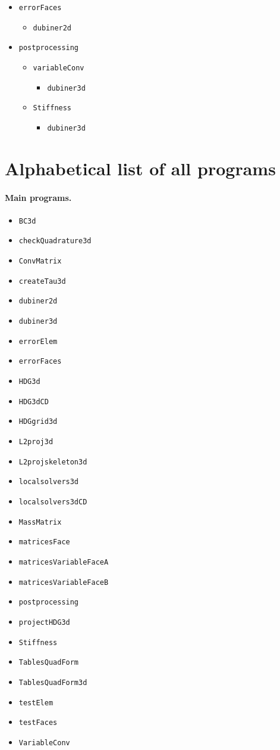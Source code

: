 \documentclass[10pt,english]{article}
\begin{document}
\begin{itemize}
\begin{itemize}
\end{itemize}
\item{\tt errorFaces}
\begin{itemize}
\item {\tt dubiner2d}
\end{itemize}
\item {\tt postprocessing}
\begin{itemize}
\item {\tt variableConv}
\begin{itemize}
\item {\tt dubiner3d}
\end{itemize}
\item{\tt Stiffness}
\begin{itemize}
\item {\tt dubiner3d}
\end{itemize}
\end{itemize}
\end{itemize}


\section{Alphabetical list of all programs}

\paragraph{Main programs.} 
\begin{itemize}
\item {\tt BC3d}
\item {\tt checkQuadrature3d}
\item {\tt ConvMatrix}
\item {\tt createTau3d}
\item {\tt dubiner2d}
\item {\tt dubiner3d}
\item {\tt errorElem}
\item {\tt errorFaces}
\item {\tt HDG3d}
\item {\tt HDG3dCD}
\item {\tt HDGgrid3d}
\item {\tt L2proj3d}
\item {\tt L2projskeleton3d}
\item {\tt localsolvers3d}
\item {\tt localsolvers3dCD}
\item {\tt MassMatrix}
\item {\tt matricesFace}
\item {\tt matricesVariableFaceA}
\item {\tt matricesVariableFaceB}
\item {\tt postprocessing}
\item {\tt projectHDG3d}
\item {\tt Stiffness}
\item {\tt TablesQuadForm}
\item {\tt TablesQuadForm3d}
\item {\tt testElem}
\item {\tt testFaces}
\item {\tt VariableConv}
\end{itemize}
\end{document}
